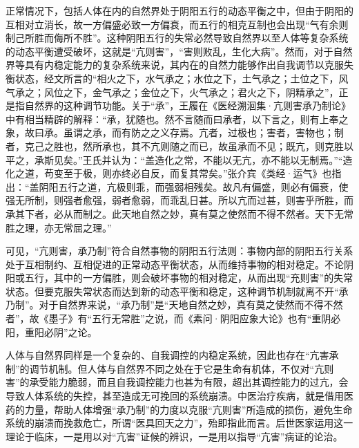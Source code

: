 \documentclass[12pt]{ctexbook}
\begin{document}
正常情况下，包括人体在内的自然界处于阴阳五行的动态平衡之中，但由于阴阳的互相对立消长，故一方偏盛必致一方偏衰，而五行的相克互制也会出现“气有余则制己所胜而侮所不胜”。这种阴阳五行的失常必然导致自然界以至人体等复杂系统的动态平衡遭受破坏，这就是“亢则害”，“害则败乱，生化大病”。然而，对于自然界等具有内稳定能力的复杂系统来说，其内在的自然力能够作出自我调节以克服失衡状态，经文所言的“相火之下，水气承之；水位之下，土气承之；土位之下，风气承之；风位之下，金气承之；金位之下，火气承之；君火之下，阴精承之”，正是指自然界的这种调节功能。关于“承”，王履在《医经溯洄集·亢则害承乃制论》中有相当精辟的解释：“承，犹随也。然不言随而曰承者，以下言之，则有上奉之象，故曰承。虽谓之承，而有防之之义存焉。亢者，过极也；害者，害物也；制者，克己之胜也，然所承也，其不亢则随之而已，故虽承而不见；既亢，则克胜以平之，承斯见矣。”王氏并认为：“盖造化之常，不能以无亢，亦不能以无制焉。”“造化之道，苟变至于极，则亦终必自反，而复其常矣。”张介宾《类经·运气》也指出：“盖阴阳五行之道，亢极则乖，而强弱相残矣。故凡有偏盛，则必有偏衰，使强无所制，则强者愈强，弱者愈弱，而乖乱日甚。所以亢而过甚，则害乎所胜，而承其下者，必从而制之。此天地自然之妙，真有莫之使然而不得不然者。天下无常胜之理，亦无常屈之理。”

可见，“亢则害，承乃制”符合自然事物的阴阳五行法则：事物内部的阴阳五行关系处于互相制约、互相促进的正常动态平衡状态，从而维持事物的相对稳定。不论阴阳或五行，其中的一方偏胜，则会破坏事物的相对稳定，从而出现“充则害”的失常状态。但要克服失常状态而达到新的动态平衡和稳定，这种调节机制就离不开“承乃制”。对于自然界来说，“承乃制”是“天地自然之妙，真有莫之使然而不得不然者”，故《墨子》有“五行无常胜”之说，而《素问·阴阳应象大论》也有“重阴必阳，重阳必阴”之论。



人体与自然界同样是一个复杂的、自我调控的内稳定系统，因此也存在“亢害承制”的调节机制。但人体与自然界不同之处在于它是生命有机体，不仅对“亢则害”的承受能力脆弱，而且自我调控能力也甚为有限，超出其调控能力的过亢，会导致人体系统的失控，甚至造成无可挽回的系统崩溃。中医治疗疾病，就是借用医药的力量，帮助人体增强“承乃制”的力度以克服“亢则害”所造成的损伤，避免生命系统的崩溃而挽救危亡，所谓“医具回天之力”，殆即指此而言。后世医家运用这一理论于临床，一是用以对“亢害”证候的辨识，一是用以指导“亢害”病证的论治。
\end{document}
